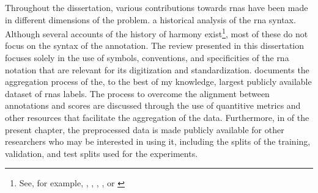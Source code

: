 
Throughout the dissertation, various contributions towards
\glspl{rna} have been made in different dimensions of the
problem.  a
historical analysis of the \gls{rna} syntax. Although
several accounts of the history of harmony
exist\footnote{See, for example,
\textcite{christensen2002tonality},
\textcite{grave1988praise}, \textcite{laitz2010graduate},
\textcite{sansallovich2013quintas}, or
\textcite{wason1985viennese}}, most of these do not focus on
the syntax of the annotation. The review presented in this
dissertation focuses solely in the use of symbols,
conventions, and specificities of the \gls{rna} notation
that are relevant for its digitization and standardization.
 documents the
aggregation process of the, to the best of my knowledge,
largest publicly available dataset of \glspl{rna} labels.
The process to overcome the alignment between annotations
and scores are discussed through the use of quantitive
metrics and other resources that facilitate the aggregation
of the data. Furthermore, in  of
the present chapter, the preprocessed data is made publicly
available for other researchers who may be interested in
using it, including the splits of the training, validation,
and test splits used for the experiments.
